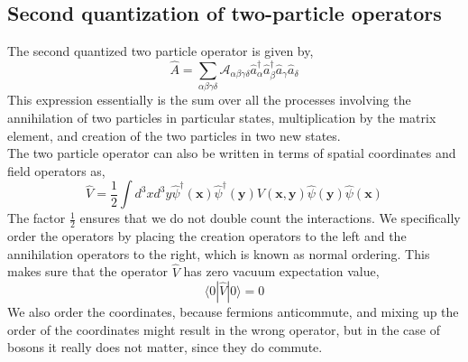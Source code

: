 \subsection{Second quantization of two-particle operators}
The second quantized two particle operator is given by,
\begin{equation}
    \hat{A}=\sum_{\alpha\beta\gamma\delta}\mathcal{A}_{\alpha\beta\gamma\delta}\hat{a}^\dagger_\alpha\hat{a}^\dagger_\beta\hat{a}_\gamma\hat{a}_\delta
\end{equation}
This expression essentially is the sum over all the processes involving the annihilation of two particles in particular states, multiplication by the matrix element, and creation of the two particles in two new states.\\
The two particle operator can also be written in terms of spatial coordinates and field operators as,
\begin{equation}
    \hat{V}=\frac{1}{2}\int d^3xd^3y\hat{\psi}^\dagger(\textbf{x})\hat{\psi}^\dagger(\textbf{y})V(\textbf{x},\textbf{y})\hat{\psi}(\textbf{y})\hat{\psi}(\textbf{x})
\end{equation}
The factor $\frac{1}{2}$ ensures that we do not double count the interactions. We specifically order the operators by placing the creation operators to the left and the annihilation operators to the right, which is known as normal ordering. This makes sure that the operator $\hat{V}$ has zero vacuum expectation value,
\begin{equation}
    \langle 0|\hat{V}|0\rangle=0
\end{equation}
We also order the coordinates, because fermions anticommute, and mixing up the order of the coordinates might result in the wrong operator, but in the case of bosons it really does not matter, since they do commute.

